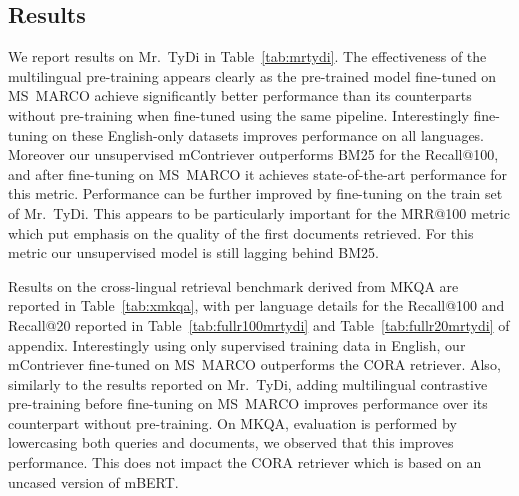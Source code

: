 \documentclass[10pt]{article} %
\def \oursmulti          {mContriever}
\begin{document}
\subsection{Results}
We report results on Mr.~TyDi in Table~\ref{tab:mrtydi}.
The effectiveness of the multilingual pre-training appears clearly as the pre-trained model fine-tuned on MS~MARCO achieve significantly better performance than its counterparts without pre-training when fine-tuned using the same pipeline.
Interestingly fine-tuning on these English-only datasets improves performance on all languages.
Moreover our unsupervised \oursmulti{} outperforms BM25 for the Recall@100, and after fine-tuning on MS~MARCO it achieves state-of-the-art performance for this metric.
Performance can be further improved by fine-tuning on the train set of Mr.~TyDi.
This appears to be particularly important for the MRR@100 metric which put emphasis on the quality of the first documents retrieved.
For this metric our unsupervised model is still lagging behind BM25.

Results on the cross-lingual retrieval benchmark derived from MKQA are reported in Table~\ref{tab:xmkqa}, with per language details for the Recall@100 and Recall@20 reported in Table~\ref{tab:fullr100mrtydi} and Table~\ref{tab:fullr20mrtydi} of appendix.
Interestingly using only supervised training data in English, our \oursmulti{} fine-tuned on MS~MARCO outperforms the CORA retriever.
Also, similarly to the results reported on Mr.~TyDi, adding multilingual contrastive pre-training before fine-tuning on MS~MARCO improves performance over its counterpart without pre-training.
On MKQA, evaluation is performed by lowercasing both queries and documents, we observed that this improves performance.
This does not impact the CORA retriever which is based on an uncased version of mBERT.
\end{document}
